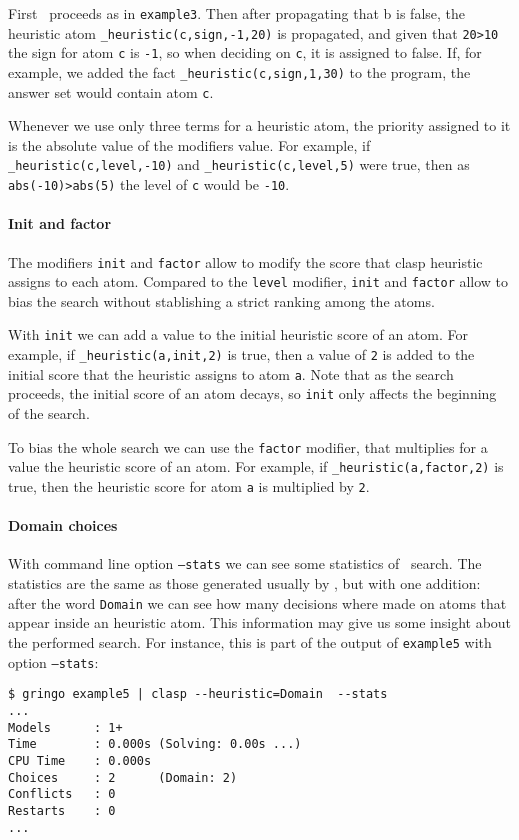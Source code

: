 First \clasp\ proceeds as in \texttt{example3}.
Then after propagating that b is false,  the heuristic atom \texttt{\_heuristic(c,sign,-1,20)} is propagated,
and given that \texttt{20>10} the sign for atom \texttt{c} is \texttt{-1}, so when deciding on \texttt{c}, it is assigned to false.
If, for example, we added the fact \texttt{\_heuristic(c,sign,1,30)} to the program, the answer set would contain atom \texttt{c}.

Whenever we use only three terms for a heuristic atom, the priority assigned to it is the absolute value of the modifiers value.
For example, if \texttt{\_heuristic(c,level,-10)} and \texttt{\_heuristic(c,level,5)} were true,
then as \texttt{abs(-10)>abs(5)} the level of \texttt{c} would be \texttt{-10}.

\paragraph{Init and factor}

The modifiers \texttt{init} and \texttt{factor} allow to modify the score that clasp heuristic assigns to each atom.
Compared to the \texttt{level} modifier, \texttt{init} and \texttt{factor} allow to bias the search without stablishing a strict ranking among the atoms.

With \texttt{init} we can add a value to the initial heuristic score of an atom.
For example, if \texttt{\_heuristic(a,init,2)} is true, then a value of \texttt{2} is added to
the initial score that the heuristic assigns to atom \texttt{a}.
Note that as the search proceeds, the initial score of an atom decays, so \texttt{init} only affects the beginning of the search.

To bias the whole search we can use the \texttt{factor} modifier,
that multiplies for a value the heuristic score of an atom.
For example, if \texttt{\_heuristic(a,factor,2)} is true, then the heuristic score for atom \texttt{a}  is multiplied by \texttt{2}.

\paragraph{Domain choices}

With command line option \texttt{--stats} we can see some statistics of \clasp\ search.
The statistics are the same as those generated usually by \clasp, but with one addition:
after the word \texttt{Domain} we can see how many decisions where made on atoms that appear  inside an heuristic atom.
This information may give us some insight about the performed search.
For instance, this is part of the output of \texttt{example5} with option \texttt{--stats}:
\begin{verbatim}
$ gringo example5 | clasp --heuristic=Domain  --stats
...
Models      : 1+
Time        : 0.000s (Solving: 0.00s ...)
CPU Time    : 0.000s
Choices     : 2      (Domain: 2)
Conflicts   : 0
Restarts    : 0
...
\end{verbatim}

